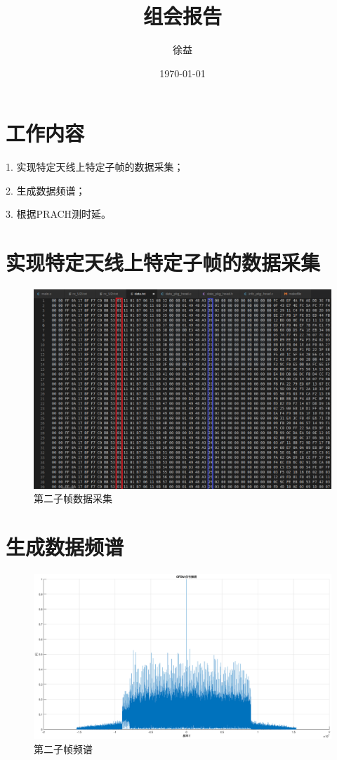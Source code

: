 \documentclass{article}
\title{组会报告}
\author{徐益}
\date{\today}
\begin{document}
\maketitle


\section{工作内容}
1. 实现特定天线上特定子帧的数据采集；

2. 生成数据频谱；

3. 根据PRACH测时延。

\section{实现特定天线上特定子帧的数据采集}
\begin{figure}[H]
	\centering
	\includegraphics[width = \textwidth]{data.png}
	\caption{第二子帧数据采集}
\end{figure}

\section{生成数据频谱}
\begin{figure}[H]
	\centering
	\includegraphics[width = \textwidth]{ofdm.eps}
	\caption{第二子帧频谱}
\end{figure}
\end{document}
